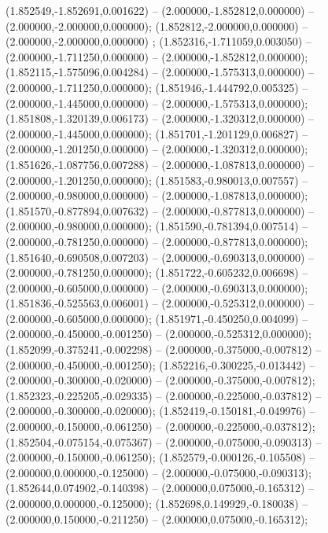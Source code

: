  (1.852549,-1.852691,0.001622) -- (2.000000,-1.852812,0.000000) -- (2.000000,-2.000000,0.000000);
 (1.852812,-2.000000,0.000000) -- (2.000000,-2.000000,0.000000) ;
 (1.852316,-1.711059,0.003050) -- (2.000000,-1.711250,0.000000) -- (2.000000,-1.852812,0.000000);
 (1.852115,-1.575096,0.004284) -- (2.000000,-1.575313,0.000000) -- (2.000000,-1.711250,0.000000);
 (1.851946,-1.444792,0.005325) -- (2.000000,-1.445000,0.000000) -- (2.000000,-1.575313,0.000000);
 (1.851808,-1.320139,0.006173) -- (2.000000,-1.320312,0.000000) -- (2.000000,-1.445000,0.000000);
 (1.851701,-1.201129,0.006827) -- (2.000000,-1.201250,0.000000) -- (2.000000,-1.320312,0.000000);
 (1.851626,-1.087756,0.007288) -- (2.000000,-1.087813,0.000000) -- (2.000000,-1.201250,0.000000);
 (1.851583,-0.980013,0.007557) -- (2.000000,-0.980000,0.000000) -- (2.000000,-1.087813,0.000000);
 (1.851570,-0.877894,0.007632) -- (2.000000,-0.877813,0.000000) -- (2.000000,-0.980000,0.000000);
 (1.851590,-0.781394,0.007514) -- (2.000000,-0.781250,0.000000) -- (2.000000,-0.877813,0.000000);
 (1.851640,-0.690508,0.007203) -- (2.000000,-0.690313,0.000000) -- (2.000000,-0.781250,0.000000);
 (1.851722,-0.605232,0.006698) -- (2.000000,-0.605000,0.000000) -- (2.000000,-0.690313,0.000000);
 (1.851836,-0.525563,0.006001) -- (2.000000,-0.525312,0.000000) -- (2.000000,-0.605000,0.000000);
 (1.851971,-0.450250,0.004099) -- (2.000000,-0.450000,-0.001250) -- (2.000000,-0.525312,0.000000);
 (1.852099,-0.375241,-0.002298) -- (2.000000,-0.375000,-0.007812) -- (2.000000,-0.450000,-0.001250);
 (1.852216,-0.300225,-0.013442) -- (2.000000,-0.300000,-0.020000) -- (2.000000,-0.375000,-0.007812);
 (1.852323,-0.225205,-0.029335) -- (2.000000,-0.225000,-0.037812) -- (2.000000,-0.300000,-0.020000);
 (1.852419,-0.150181,-0.049976) -- (2.000000,-0.150000,-0.061250) -- (2.000000,-0.225000,-0.037812);
 (1.852504,-0.075154,-0.075367) -- (2.000000,-0.075000,-0.090313) -- (2.000000,-0.150000,-0.061250);
 (1.852579,-0.000126,-0.105508) -- (2.000000,0.000000,-0.125000) -- (2.000000,-0.075000,-0.090313);
 (1.852644,0.074902,-0.140398) -- (2.000000,0.075000,-0.165312) -- (2.000000,0.000000,-0.125000);
 (1.852698,0.149929,-0.180038) -- (2.000000,0.150000,-0.211250) -- (2.000000,0.075000,-0.165312);
